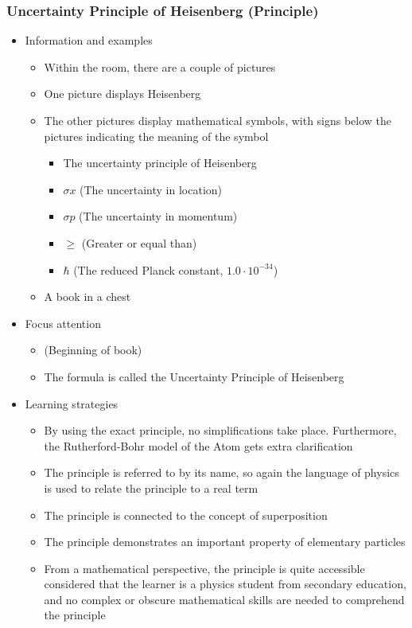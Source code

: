 \documentclass[11pt,twoside]{report} %
\begin{document}
\subsubsection{Uncertainty Principle of Heisenberg (Principle)}
\begin{itemize}
	\item Information and examples
	\begin{itemize}
		\item Within the room, there are a couple of pictures
		\item One picture displays Heisenberg
		\item The other pictures display mathematical symbols, with signs below the pictures indicating the meaning of the symbol
		\begin{itemize}
			\item The uncertainty principle of Heisenberg
			\item $\sigma x$ (The uncertainty in location)
			\item $\sigma p$ (The uncertainty in momentum)
			\item $\geq$ (Greater or equal than)
			\item $\hbar$ (The reduced Planck constant, $1.0 \cdot 10^{-34}$)
		\end{itemize}
		\item A book in a chest
	\end{itemize}
	\item Focus attention
	\begin{itemize}
		\item (Beginning of book)
		\item The formula is called the Uncertainty Principle of Heisenberg
	\end{itemize}
	\item Learning strategies
	\begin{itemize}
		\item By using the exact principle, no simplifications take place. Furthermore, the Rutherford-Bohr model of the Atom gets extra clarification
		\item The principle is referred to by its name, so again the language of physics is used to relate the principle to a real term
		\item The principle is connected to the concept of superposition
		\item The principle demonstrates an important property of elementary particles
		\item From a mathematical perspective, the principle is quite accessible considered that the learner is a physics student from secondary education, and no complex or obscure mathematical skills are needed to comprehend the principle

\end{itemize}
\end{itemize}
\end{document}
